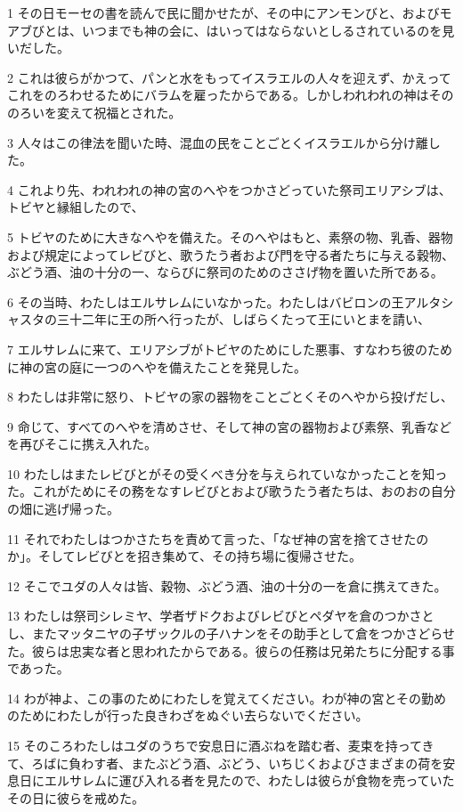\par 1 その日モーセの書を読んで民に聞かせたが、その中にアンモンびと、およびモアブびとは、いつまでも神の会に、はいってはならないとしるされているのを見いだした。
\par 2 これは彼らがかつて、パンと水をもってイスラエルの人々を迎えず、かえってこれをのろわせるためにバラムを雇ったからである。しかしわれわれの神はそののろいを変えて祝福とされた。
\par 3 人々はこの律法を聞いた時、混血の民をことごとくイスラエルから分け離した。
\par 4 これより先、われわれの神の宮のへやをつかさどっていた祭司エリアシブは、トビヤと縁組したので、
\par 5 トビヤのために大きなへやを備えた。そのへやはもと、素祭の物、乳香、器物および規定によってレビびと、歌うたう者および門を守る者たちに与える穀物、ぶどう酒、油の十分の一、ならびに祭司のためのささげ物を置いた所である。
\par 6 その当時、わたしはエルサレムにいなかった。わたしはバビロンの王アルタシャスタの三十二年に王の所へ行ったが、しばらくたって王にいとまを請い、
\par 7 エルサレムに来て、エリアシブがトビヤのためにした悪事、すなわち彼のために神の宮の庭に一つのへやを備えたことを発見した。
\par 8 わたしは非常に怒り、トビヤの家の器物をことごとくそのへやから投げだし、
\par 9 命じて、すべてのへやを清めさせ、そして神の宮の器物および素祭、乳香などを再びそこに携え入れた。
\par 10 わたしはまたレビびとがその受くべき分を与えられていなかったことを知った。これがためにその務をなすレビびとおよび歌うたう者たちは、おのおの自分の畑に逃げ帰った。
\par 11 それでわたしはつかさたちを責めて言った、「なぜ神の宮を捨てさせたのか」。そしてレビびとを招き集めて、その持ち場に復帰させた。
\par 12 そこでユダの人々は皆、穀物、ぶどう酒、油の十分の一を倉に携えてきた。
\par 13 わたしは祭司シレミヤ、学者ザドクおよびレビびとペダヤを倉のつかさとし、またマッタニヤの子ザックルの子ハナンをその助手として倉をつかさどらせた。彼らは忠実な者と思われたからである。彼らの任務は兄弟たちに分配する事であった。
\par 14 わが神よ、この事のためにわたしを覚えてください。わが神の宮とその勤めのためにわたしが行った良きわざをぬぐい去らないでください。
\par 15 そのころわたしはユダのうちで安息日に酒ぶねを踏む者、麦束を持ってきて、ろばに負わす者、またぶどう酒、ぶどう、いちじくおよびさまざまの荷を安息日にエルサレムに運び入れる者を見たので、わたしは彼らが食物を売っていたその日に彼らを戒めた。
